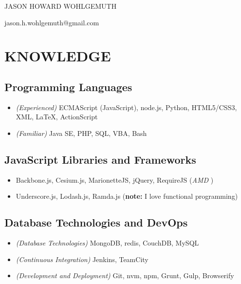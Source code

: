 \documentclass[10pt]{article}
\begin{document}
\begin{center}\Huge {JASON HOWARD WOHLGEMUTH}\end{center}
\begin{center}jason.h.wohlgemuth@gmail.com\end{center}

\section{KNOWLEDGE}\label{knowledge}

\subsection{Programming Languages}\label{programming-languages}

\begin{itemize}
\itemsep1pt\parskip0pt
\item
  \emph{(Experienced)} ECMAScript (JavaScript), node.js, Python,
  HTML5/CSS3, XML, LaTeX, ActionScript
\item
  \emph{(Familiar)} Java SE, PHP, SQL, VBA, Bash
\end{itemize}

\subsection{JavaScript Libraries and
Frameworks}\label{javascript-libraries-and-frameworks}

\begin{itemize}
\itemsep1pt\parskip0pt
\item
  Backbone.js, Cesium.js, MarionetteJS, jQuery, RequireJS (\emph{AMD })
\item
  Underscore.js, Lodash.js, Ramda.js (\textbf{note:} I love functional
  programming)
\end{itemize}

\subsection{Database Technologies and
DevOps}\label{database-technologies-and-devops}

\begin{itemize}
\itemsep1pt\parskip0pt
\item
  \emph{(Database Technologies)} MongoDB, redis, CouchDB, MySQL
\item
  \emph{(Continuous Integration)} Jenkins, TeamCity
\item
  \emph{(Development and Deployment)} Git, nvm, npm, Grunt, Gulp,
  Browserify
\end{itemize}
\end{document}
